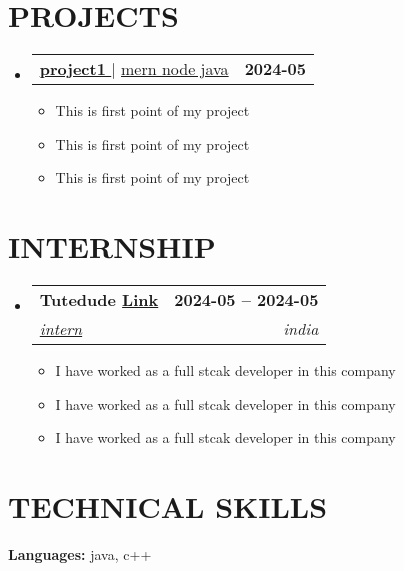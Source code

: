 \documentclass[letterpaper,11pt]{article}
\makeatletter
\newcommand{\resumeItem}[1]{
        \item\small{
          {#1 \vspace{-2pt}}
        }
      }
\newcommand{\resumeSubheading}[4]{
        \vspace{-2pt}\item
          \begin{tabular*}{1.0\textwidth}[t]{l@{\extracolsep{\fill}}r}
            \textbf{\large#1} & \textbf{\small #2} \\
            \textit{\large#3} & \textit{\small #4} \\
            
          \end{tabular*}\vspace{-7pt}
      }
\newcommand{\resumeProjectHeading}[2]{
          \item
          \begin{tabular*}{1.001\textwidth}{l@{\extracolsep{\fill}}r}
            \small#1 & \textbf{\small #2}\\
          \end{tabular*}\vspace{-7pt}
      }
\newcommand{\resumeSubHeadingListStart}{\begin{itemize}[leftmargin=0.0in, label={}]}
\newcommand{\resumeSubHeadingListEnd}{\end{itemize}}
\newcommand{\resumeItemListStart}{\begin{itemize}}
\newcommand{\resumeItemListEnd}{\end{itemize}\vspace{-5pt}}
\makeatother
\begin{document}
        \section{PROJECTS}
        \vspace{-5pt}
        \resumeSubHeadingListStart
          
              \resumeProjectHeading
                {\href{https://hi.com}{\textbf{\large{\underline{project1}}} \href{https://hi.com}{\raisebox{-0.1\height} }} $|$ \large{\underline{mern node java}} }{2024-05}
              \resumeItemListStart
                \resumeItem{\normalsize{This is first point of my project}}
                \resumeItem{\normalsize{This is first point of my project}}
                \resumeItem{\normalsize{This is first point of my project}}
              \resumeItemListEnd
              \vspace{-13pt}
            
        \resumeSubHeadingListEnd
        \vspace{-12pt}
    
         \section{INTERNSHIP}
        \vspace{-5pt}
        \resumeSubHeadingListStart
          
              \resumeSubheading
                {Tutedude \href{https://link.com}{Link}}{2024-05 -- 2024-05}
                {\underline{intern}}{india}
              \resumeItemListStart
                \resumeItem{\normalsize{I have worked as a full stcak developer in this company}}
                \resumeItem{\normalsize{I have worked as a full stcak developer in this company}}
                \resumeItem{\normalsize{I have worked as a full stcak developer in this company}}
              \resumeItemListEnd
            
        \resumeSubHeadingListEnd
        \vspace{-12pt}
    
        \section{TECHNICAL SKILLS}
        \begin{itemize}[leftmargin=0.15in, label={}]
          \small{\item{ \textbf{\normalsize{Languages:}}{ \normalsize{java, c++}} \\ }}
         \end{itemize}
         \vspace{-15pt}
    
\end{document}
